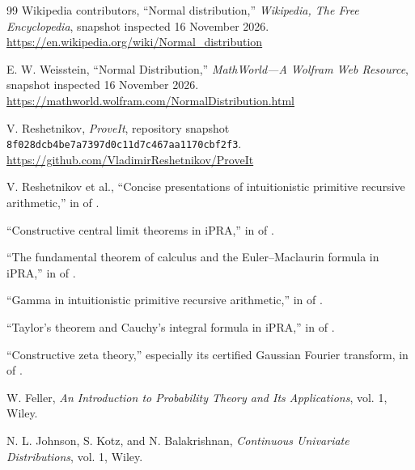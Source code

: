 \documentclass[11pt]{article}
\newcommand{\commitsha}{\texttt{8f028dcb4be7a7397d0c11d7c467aa1}\allowbreak\texttt{170cbf2f3}}
\begin{document}
\appendix



\begin{thebibliography}{99}
Wikipedia contributors, ``Normal distribution,'' \emph{Wikipedia, The Free Encyclopedia}, snapshot inspected 16 November 2026.\\
\url{https://en.wikipedia.org/wiki/Normal_distribution}

E. W. Weisstein, ``Normal Distribution,'' \emph{MathWorld---A Wolfram Web Resource}, snapshot inspected 16 November 2026.\\
\url{https://mathworld.wolfram.com/NormalDistribution.html}

V. Reshetnikov, \emph{ProveIt}, repository snapshot \commitsha.\\
\url{https://github.com/VladimirReshetnikov/ProveIt}

V. Reshetnikov et al., ``Concise presentations of intuitionistic primitive recursive arithmetic,'' in  of \cite{ProveIt}.

``Constructive central limit theorems in iPRA,'' in  of \cite{ProveIt}.

``The fundamental theorem of calculus and the Euler--Maclaurin formula in iPRA,'' in  of \cite{ProveIt}.

``Gamma in intuitionistic primitive recursive arithmetic,'' in  of \cite{ProveIt}.

``Taylor's theorem and Cauchy's integral formula in iPRA,'' in  of \cite{ProveIt}.

``Constructive zeta theory,'' especially its certified Gaussian Fourier transform, in  of \cite{ProveIt}.

W. Feller, \emph{An Introduction to Probability Theory and Its Applications}, vol. 1, Wiley.

N. L. Johnson, S. Kotz, and N. Balakrishnan, \emph{Continuous Univariate Distributions}, vol. 1, Wiley.
\end{thebibliography}
\end{document}
